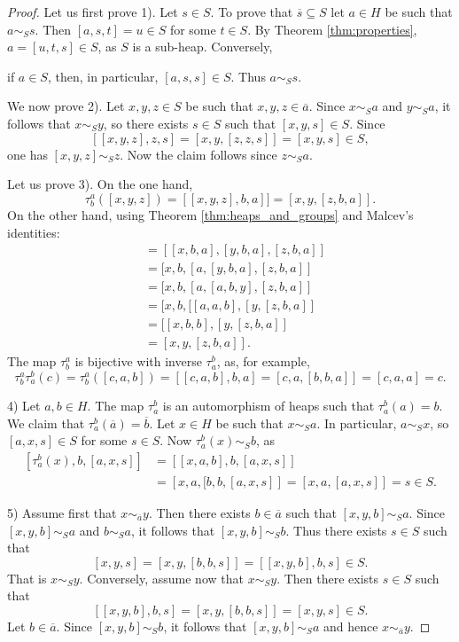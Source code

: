 \documentclass{svmult}
\begin{document}
\begin{proof}
    Let us first prove 1). Let $s\in S$. To prove that 
    $\overline{s}\subseteq S$ let 
    $a\in H$ be such that $a\sim_Ss$. Then 
    $[a,s,t]=u\in S$ for some $t\in S$. By Theorem \ref{thm:properties}, 
    $a=[u,t,s]\in S$, as $S$ is a sub-heap. Conversely, 

    if $a\in S$, then, in particular, $[a,s,s]\in S$. Thus 
    $a\sim_Ss$. 

    We now prove 2). Let $x,y,z\in S$ be such that $x,y,z\in\overline{a}$. 
    Since $x\sim_Sa$ and $y\sim_Sa$, it follows that 
    $x\sim_Sy$, so there exists $s\in S$ such that $[x,y,s]\in S$.
    Since  
    \[
    [[x,y,z],z,s]=[x,y,[z,z,s]]=[x,y,s]\in S, 
    \]
    one has $[x,y,z]\sim_Sz$. Now the claim follows since 
    $z\sim_Sa$.
    
    Let us prove 3). On the one hand,
    \[
    \tau_b^a([x,y,z])=[[x,y,z],b,a]]=[x,y,[z,b,a]].
    \]
    On the other hand, using Theorem \ref{thm:heaps_and_groups}
    and Malcev's identities:
    \begin{align*}
        [\tau_b^a(x),\tau_b^a(y),\tau_b^a(z)] &= 
        [[x,b,a],[y,b,a],[z,b,a]]\\
        &=[x,b,[a,[y,b,a],[z,b,a]]\\
        &=[x,b,[a,[a,b,y],[z,b,a]]\\
        &=[x,b,[[a,a,b],[y,[z,b,a]]\\
        &=[[x,b,b],[y,[z,b,a]]\\
        &=[x,y,[z,b,a]].
    \end{align*}
    The map $\tau_b^a$ is bijective with inverse $\tau_a^b$, as, 
    for example, 
    \[
    \tau_b^a\tau_a^b(c)
    =\tau_b^a([c,a,b])=[[c,a,b],b,a]=[c,a,[b,b,a]]=[c,a,a]=c.
    \]
    
    4) Let $a,b\in H$. The map $\tau_a^b$ is an automorphism of heaps
    such that $\tau_a^b(a)=b$. We claim that 
    $\tau_a^b(\overline{a})=\overline{b}$. Let $x\in H$ be such that 
    $x\sim_Sa$. In particular, $a\sim_Sx$, so 
    $[a,x,s]\in S$ for some $s\in S$. Now 
    $\tau_a^b(x)\sim_Sb$, as 
    \begin{align*}
    \left[\tau_a^b(x),b,[a,x,s]\right]&=\left[[x,a,b],b,[a,x,s]\right]\\
    &=\left[x,a,[b,b,[a,x,s]\right]
    =\left[x,a,[a,x,s]\right]=s\in S.
    \end{align*}
    
    5) Assume first that $x\sim_{\overline{a}}y$. Then there exists $b\in\overline{a}$ 
    such that $[x,y,b]\sim_Sa$. Since $[x,y,b]\sim_Sa$ and $b\sim_Sa$, it follows
    that $[x,y,b]\sim_Sb$. Thus there exists $s\in S$
    such that 
    \[
    [x,y,s]=[x,y,[b,b,s]]=[[x,y,b],b,s]\in S.
    \]
    That is $x\sim_Sy$. Conversely, assume now that $x\sim_Sy$. Then 
    there exists $s\in S$ such that 
    \[
    [[x,y,b],b,s]=[x,y,[b,b,s]]=[x,y,s]\in S.
    \]
    Let $b\in\overline{a}$. Since $[x,y,b]\sim_Sb$, it follows that 
    $[x,y,b]\sim_Sa$ and hence $x\sim_{\overline{a}}y$. 
\end{proof}
\end{document}

